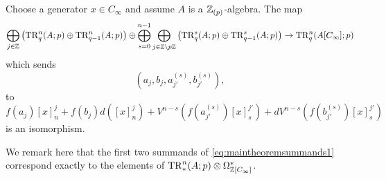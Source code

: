 %
%
%



\begin{thm}
Choose a generator $x\in C_\infty$ and assume
$A$ is a $\mathbb{Z}_{(p)}$-algebra. The map $$\bigoplus_{j\in \mathbb{Z}} \left(\mathrm{TR}^n_q(A;p)\oplus \mathrm{TR}^n_{q-1}(A;p) \right)
\oplus \bigoplus_{s=0}^{n-1}\bigoplus_{j\in \mathbb{Z}\setminus p\mathbb{Z}}
\left( \mathrm{TR}^{s}_q(A;p)\oplus \mathrm{TR}^{s}_{q-1}(A;p)\right)
\rightarrow \mathrm{TR}^n_q(A[C_\infty];p)$$
which sends
$$(a_j, b_j , a_{j'}^{(s)} ,b_{j'}^{(s)}),$$
to
\begin{equation}\label{eq:maintheoremsummands1}
f(a_j)[x]^j_n + f(b_j)d([x]^j_n)
+V^{n-s}(f(a_{j'}^{(s)})[x]^{j'}_{s}) + dV^{n-s}(f(b_{j'}^{(s)})[x]^{j'}_{s})
\end{equation}
 is an isomorphism.
\end{thm}
We remark here that the first two summands of \eqref{eq:maintheoremsummands1}
correspond exactly to the elements of $\mathrm{TR}^n_\ast(A;p)\otimes \Omega^\ast_{\mathbb{Z}[C_\infty]}$.

